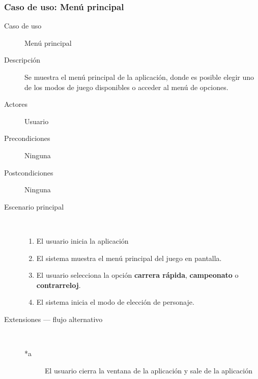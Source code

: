 \subsubsection{Caso de uso: Menú principal}

\begin{description}
    \item[Caso de uso] Menú principal
    \item[Descripción] Se muestra el menú principal de la aplicación, donde es
    posible elegir uno de los modos de juego disponibles
    o acceder al menú de opciones.
    \item[Actores] Usuario
    \item[Precondiciones] Ninguna
    \item[Postcondiciones] Ninguna
    \item[Escenario principal] $\quad$
        \begin{enumerate}
            \item El usuario inicia la aplicación
            \item El sistema muestra el menú principal del juego en pantalla.
            \item El usuario selecciona la opción \textbf{carrera rápida}, \textbf{campeonato} o \textbf{contrarreloj}.
            \item El sistema inicia el modo de elección de personaje.
        \end{enumerate}
    \item[Extensiones --- flujo alternativo] $\quad$
        \begin{description}
            \item[*a ] El usuario cierra la ventana de la aplicación y sale de la aplicación
            
            
            

\end{description}
\end{description}
